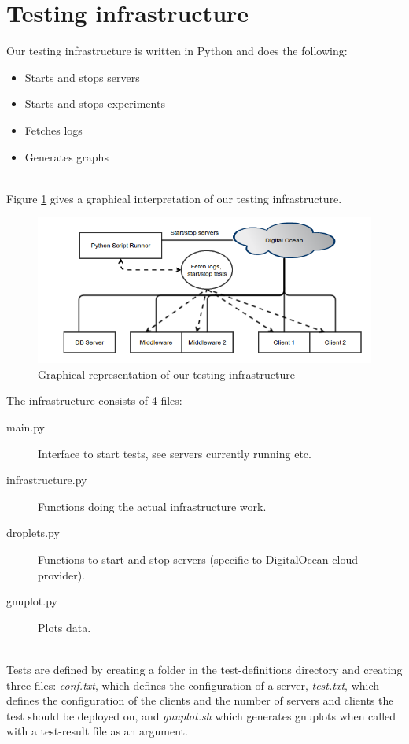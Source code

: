 \documentclass{article}
\begin{document}
    \section{Testing infrastructure}
        Our testing infrastructure is written in Python and does the following:
        \begin{itemize}
            \item Starts and stops servers
            \item Starts and stops experiments
            \item Fetches logs
            \item Generates graphs
        \end{itemize}
        ~\\
        Figure \ref{fig:testing_infrastructure} gives a graphical interpretation of our testing infrastructure.\\
         \begin{figure}[H]
             \centering
             \includegraphics[scale=0.50]{testing_infrastructure}
             \caption{Graphical representation of our testing infrastructure}
             \label{fig:testing_infrastructure}
         \end{figure}
        The infrastructure consists of 4 files:
        \begin{description}
            \item[main.py] Interface to start tests, see servers currently running etc.
            \item[infrastructure.py] Functions doing the actual infrastructure work.
            \item[droplets.py] Functions to start and stop servers (specific to DigitalOcean cloud provider).
            \item[gnuplot.py] Plots data.
        \end{description}
        ~\\
        Tests are defined by creating a folder in the test-definitions directory and creating three files: \textit{conf.txt}, which defines the configuration of a server, \textit{test.txt}, which defines the configuration of the clients and the number of servers and clients the test should be deployed on, and \textit{gnuplot.sh} which generates gnuplots when called with a test-result file as an argument.\\
\end{document}
